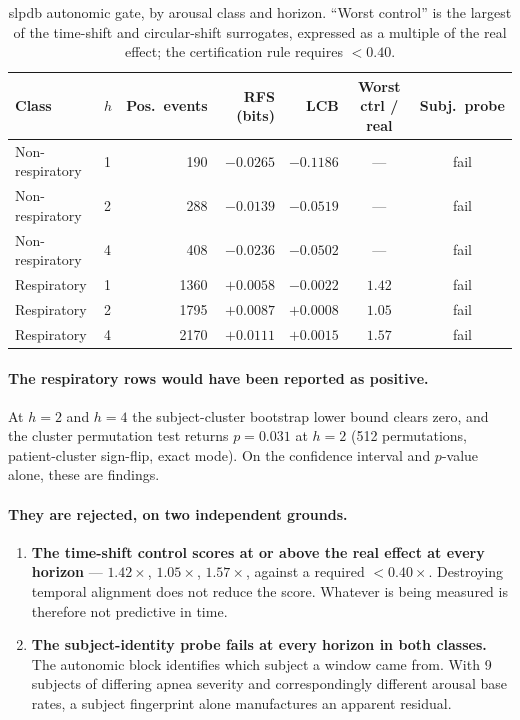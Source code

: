 \documentclass[11pt]{article}
\begin{document}
\begin{table}[h]
\centering
\small
\caption{slpdb autonomic gate, by arousal class and horizon. ``Worst control''
is the largest of the time-shift and circular-shift surrogates, expressed as a
multiple of the real effect; the certification rule requires $< 0.40$.}
\begin{tabular}{@{}llrrrcc@{}}
\toprule
Class & $h$ & Pos.\ events & RFS (bits) & LCB & Worst ctrl / real & Subj.\ probe \\
\midrule
Non-respiratory & 1 & 190 & $-0.0265$ & $-0.1186$ & --- & fail \\
Non-respiratory & 2 & 288 & $-0.0139$ & $-0.0519$ & --- & fail \\
Non-respiratory & 4 & 408 & $-0.0236$ & $-0.0502$ & --- & fail \\
\midrule
Respiratory & 1 & 1360 & $+0.0058$ & $-0.0022$ & $1.42$ & fail \\
Respiratory & 2 & 1795 & $+0.0087$ & $\mathbf{+0.0008}$ & $\mathbf{1.05}$ & fail \\
Respiratory & 4 & 2170 & $+0.0111$ & $\mathbf{+0.0015}$ & $\mathbf{1.57}$ & fail \\
\bottomrule
\end{tabular}
\end{table}

\paragraph{The respiratory rows would have been reported as positive.} At $h=2$
and $h=4$ the subject-cluster bootstrap lower bound clears zero, and the cluster
permutation test returns $p = 0.031$ at $h=2$ (512 permutations, patient-cluster
sign-flip, exact mode). On the confidence interval and $p$-value alone, these are
findings.

\paragraph{They are rejected, on two independent grounds.}
\begin{enumerate}
  \item \textbf{The time-shift control scores at or above the real effect at every
  horizon} --- $1.42\times$, $1.05\times$, $1.57\times$, against a required
  $<0.40\times$. Destroying temporal alignment does not reduce the score. Whatever
  is being measured is therefore not predictive in time.
  \item \textbf{The subject-identity probe fails at every horizon in both
  classes.} The autonomic block identifies which subject a window came from. With
  9 subjects of differing apnea severity and correspondingly different arousal
  base rates, a subject fingerprint alone manufactures an apparent residual.
\end{enumerate}
\end{document}

